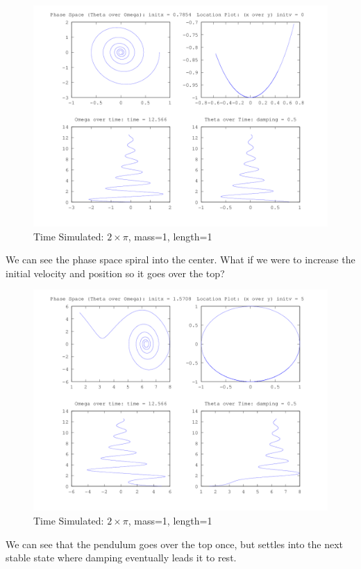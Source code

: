 \documentclass{article}
\begin{document}
\begin{figure}[H]
\caption{Time Simulated: $2\times\pi$, mass=1, length=1}
\includegraphics[width=\textwidth]{plot3}
\end{figure}

We can see the phase space spiral into the center.
What if we were to increase the initial velocity and position so it goes over the top? 

\begin{figure}[H]
\caption{Time Simulated: $2\times\pi$, mass=1, length=1}
\includegraphics[width=\textwidth]{plot4}
\end{figure}

We can see that the pendulum goes over the top once, but settles into the next stable state where damping eventually leads it to rest.
\end{document}
